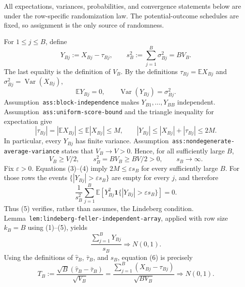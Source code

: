 All expectations, variances, probabilities, and convergence statements below are under the row-specific randomization law. The potential-outcome schedules are fixed, so assignment is the only source of randomness.

For \(1\le j\le B\), define
\[
Y_{Bj}:=X_{Bj}-\tau_{Bj},
\qquad
s_B^2:=\sum_{j=1}^B\sigma_{Bj}^2=B V_B.
\tag{1}
\]
The last equality is the definition of \(V_B\). By the definitions \(\tau_{Bj}=\mathbb E X_{Bj}\) and \(\sigma_{Bj}^2=\operatorname{Var}(X_{Bj})\),
\[
\mathbb E Y_{Bj}=0,
\qquad
\operatorname{Var}(Y_{Bj})=\sigma_{Bj}^2.
\tag{2}
\]
Assumption~\texttt{ass:block-independence} makes \(Y_{B1},\ldots,Y_{BB}\) independent. Assumption~\texttt{ass:uniform-score-bound} and the triangle inequality for expectation give
\[
|\tau_{Bj}|=|\mathbb E X_{Bj}|
\le \mathbb E|X_{Bj}|\le M,
\qquad
|Y_{Bj}|\le |X_{Bj}|+|\tau_{Bj}|\le2M.
\tag{3}
\]
In particular, every \(Y_{Bj}\) has finite variance. Assumption~\texttt{ass:nondegenerate-average-variance} states that \(V_B\to V>0\). Hence, for all sufficiently large \(B\),
\[
V_B\ge V/2,
\qquad
s_B^2=B V_B\ge BV/2>0,
\qquad
s_B\longrightarrow\infty.
\tag{4}
\]
Fix \(\varepsilon>0\). Equations (3)--(4) imply \(2M\le\varepsilon s_B\) for every sufficiently large \(B\). For those rows the events \(\{|Y_{Bj}|>\varepsilon s_B\}\) are empty for every \(j\), and therefore
\[
\frac1{s_B^2}\sum_{j=1}^B
\mathbb E\!\left[Y_{Bj}^2
\mathbf 1\{|Y_{Bj}|>\varepsilon s_B\}\right]=0.
\tag{5}
\]
Thus (5) verifies, rather than assumes, the Lindeberg condition. Lemma~\texttt{lem:lindeberg-feller-independent-array}, applied with row size \(k_B=B\) using (1)--(5), yields
\[
\frac{\sum_{j=1}^B Y_{Bj}}{s_B}\Rightarrow N(0,1).
\tag{6}
\]
Using the definitions of \(\widehat\tau_B\), \(\bar\tau_B\), and \(s_B\), equation (6) is precisely
\[
T_B:=\frac{\sqrt B(\widehat\tau_B-\bar\tau_B)}{\sqrt{V_B}}
=\frac{\sum_{j=1}^B(X_{Bj}-\tau_{Bj})}{\sqrt{B V_B}}
\Rightarrow N(0,1).
\tag{7}
\]

